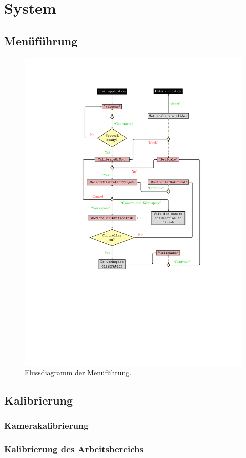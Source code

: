 \section{System}
\subsection{Menüführung}
\begin{figure}[htbp]
	\centering
	\includegraphics[width=.9\paperwidth, trim=5cm 9cm 0cm 2.5cm]{kapitel/system/MP_Menu_Flowchart.pdf}
	\caption{Flussdiagramm der Menüführung.}
\end{figure}
\subsection{Kalibrierung}
\subsubsection{Kamerakalibrierung}
\subsubsection{Kalibrierung des Arbeitsbereichs}


